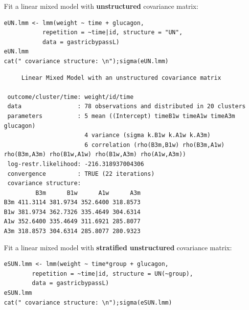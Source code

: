 \documentclass[12pt]{article}
\begin{document}
\clearpage

\noindent Fit a linear mixed model with \textbf{unstructured} covariance matrix:

\lstset{language=r,label= ,caption= ,captionpos=b,numbers=none}
\begin{lstlisting}
eUN.lmm <- lmm(weight ~ time + glucagon,
	       repetition = ~time|id, structure = "UN",
	       data = gastricbypassL)
eUN.lmm
cat(" covariance structure: \n");sigma(eUN.lmm)
\end{lstlisting}

\begin{verbatim}
     Linear Mixed Model with an unstructured covariance matrix 

 outcome/cluster/time: weight/id/time 
 data                : 78 observations and distributed in 20 clusters 
 parameters          : 5 mean ((Intercept) timeB1w timeA1w timeA3m glucagon) 
                       4 variance (sigma k.B1w k.A1w k.A3m) 
                       6 correlation (rho(B3m,B1w) rho(B3m,A1w) rho(B3m,A3m) rho(B1w,A1w) rho(B1w,A3m) rho(A1w,A3m)) 
 log-restr.likelihood: -216.318937004306 
 convergence         : TRUE (22 iterations)
 covariance structure: 
         B3m      B1w      A1w      A3m
B3m 411.3114 381.9734 352.6400 318.8573
B1w 381.9734 362.7326 335.4649 304.6314
A1w 352.6400 335.4649 311.6921 285.8077
A3m 318.8573 304.6314 285.8077 280.9323
\end{verbatim}

\clearpage

\noindent Fit a linear mixed model with \textbf{stratified unstructured} covariance matrix:

\lstset{language=r,label= ,caption= ,captionpos=b,numbers=none}
\begin{lstlisting}
eSUN.lmm <- lmm(weight ~ time*group + glucagon,
		repetition = ~time|id, structure = UN(~group),
		data = gastricbypassL)
eSUN.lmm
cat(" covariance structure: \n");sigma(eSUN.lmm)
\end{lstlisting}
\end{document}
